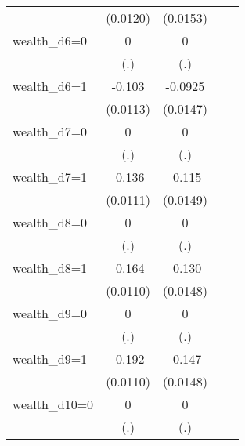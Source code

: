 \begin{table}[htbp]
\begin{tabular}{l*{4}{c}}
                & (0.0120)         & (0.0153)         &                  &                  \\
\addlinespace
wealth\_d6=0     &        0         &        0         &                  &                  \\
                &      (.)         &      (.)         &                  &                  \\
\addlinespace
wealth\_d6=1     &   -0.103\sym{***}&  -0.0925\sym{***}&                  &                  \\
                & (0.0113)         & (0.0147)         &                  &                  \\
\addlinespace
wealth\_d7=0     &        0         &        0         &                  &                  \\
                &      (.)         &      (.)         &                  &                  \\
\addlinespace
wealth\_d7=1     &   -0.136\sym{***}&   -0.115\sym{***}&                  &                  \\
                & (0.0111)         & (0.0149)         &                  &                  \\
\addlinespace
wealth\_d8=0     &        0         &        0         &                  &                  \\
                &      (.)         &      (.)         &                  &                  \\
\addlinespace
wealth\_d8=1     &   -0.164\sym{***}&   -0.130\sym{***}&                  &                  \\
                & (0.0110)         & (0.0148)         &                  &                  \\
\addlinespace
wealth\_d9=0     &        0         &        0         &                  &                  \\
                &      (.)         &      (.)         &                  &                  \\
\addlinespace
wealth\_d9=1     &   -0.192\sym{***}&   -0.147\sym{***}&                  &                  \\
                & (0.0110)         & (0.0148)         &                  &                  \\
\addlinespace
wealth\_d10=0    &        0         &        0         &                  &                  \\
                &      (.)         &      (.)         &                  &                  \\

\end{tabular}
\end{table}
